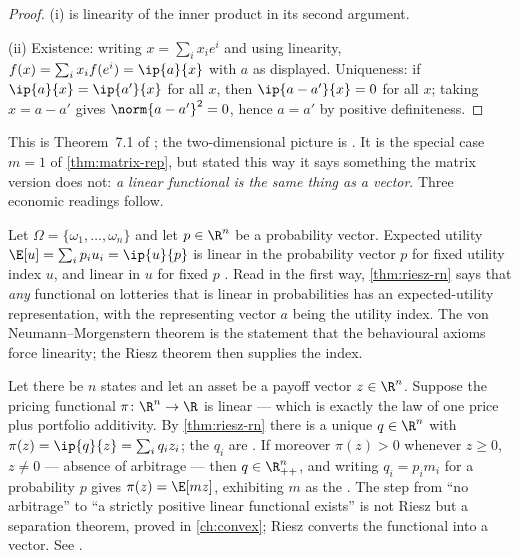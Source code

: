 \begin{proof}
	(i) is linearity of the inner product in its second argument.

	(ii) Existence: writing $x=\sum_ix_ie^i$ and using linearity,
	$f(x)=\sum_ix_if(e^i)=\ip{a}{x}$ with $a$ as displayed. Uniqueness: if
	$\ip{a}{x}=\ip{a'}{x}$ for all $x$, then $\ip{a-a'}{x}=0$ for all $x$; taking
	$x=a-a'$ gives $\norm{a-a'}^2=0$, hence $a=a'$ by positive definiteness.
\end{proof}

This is Theorem~7.1 of \textcite{fukuda2026notes}; the two-dimensional picture is
\autocite[slide 9]{fukuda2026analysis}. It is the special case $m=1$ of
\autoref{thm:matrix-rep}, but stated this way it says something the matrix
version does not: \emph{a linear functional is the same thing as a vector}. Three
economic readings follow.

\begin{eg}\label{eg:eu-riesz}
	Let $\Omega=\{\omega_1,\dots,\omega_n\}$ and let $p\in\R^n$ be a probability
	vector. Expected utility $\E[u]=\sum_ip_iu_i=\ip{u}{p}$ is linear in the
	probability vector $p$ for fixed utility index $u$, and linear in $u$ for fixed
	$p$ \autocite[slide 8]{fukuda2026analysis}. Read in the first way,
	\autoref{thm:riesz-rn} says that \emph{any} functional on lotteries that is
	linear in probabilities has an expected-utility representation, with the
	representing vector $a$ being the utility index. The von Neumann--Morgenstern
	theorem is the statement that the behavioural axioms force linearity; the Riesz
	theorem then supplies the index.
\end{eg}

\begin{eg}\label{eg:state-prices}
	Let there be $n$ states and let an asset be a payoff vector $z\in\R^n$. Suppose
	the pricing functional $\pi\colon\R^n\to\R$ is linear --- which is exactly the
	law of one price plus portfolio additivity. By \autoref{thm:riesz-rn} there is a
	unique $q\in\R^n$ with $\pi(z)=\ip{q}{z}=\sum_iq_iz_i$; the $q_i$ are
	. If moreover $\pi(z)>0$ whenever
	$z\geq0$, $z\neq0$ --- absence of arbitrage --- then $q\in\R^n_{++}$, and
	writing $q_i=p_im_i$ for a probability $p$ gives
	$\pi(z)=\E[mz]$, exhibiting $m$ as the . The
	step from ``no arbitrage'' to ``a strictly positive linear functional exists''
	is not Riesz but a separation theorem, proved in \autoref{ch:convex}; Riesz
	converts the functional into a vector. See
	\textcite[Ch.~2]{leroy2000principles}.
\end{eg}

